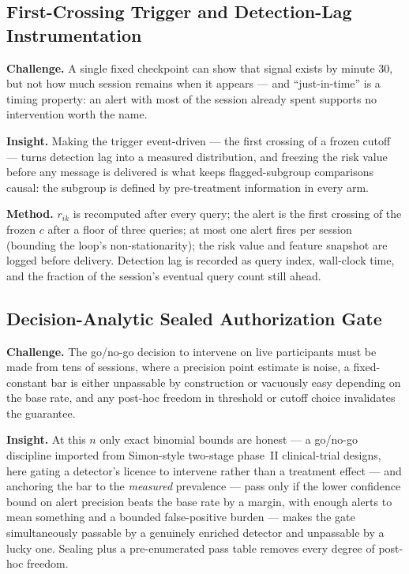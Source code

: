 \documentclass[11pt]{article}
\begin{document}
\subsection{First-Crossing Trigger and Detection-Lag Instrumentation}

\textbf{Challenge.} A single fixed checkpoint can show that signal exists by minute 30, but not how much session remains when it appears --- and ``just-in-time'' is a timing property: an alert with most of the session already spent supports no intervention worth the name.

\textbf{Insight.} Making the trigger event-driven --- the first crossing of a frozen cutoff --- turns detection lag into a measured distribution, and freezing the risk value before any message is delivered is what keeps flagged-subgroup comparisons causal: the subgroup is defined by pre-treatment information in every arm.

\textbf{Method.} $r_{ik}$ is recomputed after every query; the alert is the first crossing of the frozen $c$ after a floor of three queries; at most one alert fires per session (bounding the loop's non-stationarity); the risk value and feature snapshot are logged before delivery. Detection lag is recorded as query index, wall-clock time, and the fraction of the session's eventual query count still ahead.

\subsection{Decision-Analytic Sealed Authorization Gate}

\textbf{Challenge.} The go/no-go decision to intervene on live participants must be made from tens of sessions, where a precision point estimate is noise, a fixed-constant bar is either unpassable by construction or vacuously easy depending on the base rate, and any post-hoc freedom in threshold or cutoff choice invalidates the guarantee.

\textbf{Insight.} At this $n$ only exact binomial bounds are honest --- a go/no-go discipline imported from Simon-style two-stage phase~II clinical-trial designs, here gating a detector's licence to intervene rather than a treatment effect --- and anchoring the bar to the \emph{measured} prevalence --- pass only if the lower confidence bound on alert precision beats the base rate by a margin, with enough alerts to mean something and a bounded false-positive burden --- makes the gate simultaneously passable by a genuinely enriched detector and unpassable by a lucky one. Sealing plus a pre-enumerated pass table removes every degree of post-hoc freedom.
\end{document}
